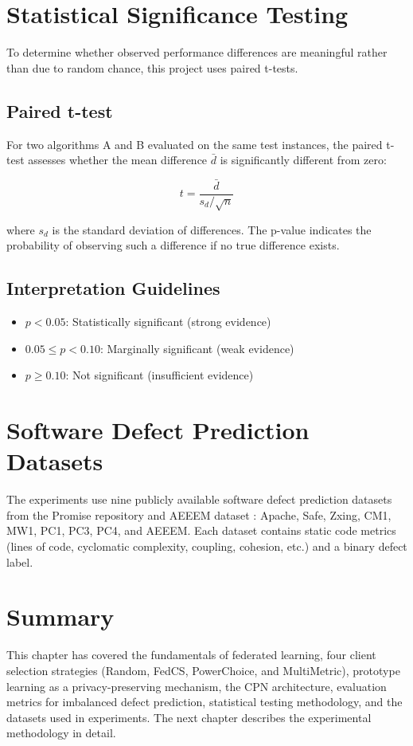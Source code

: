 \section{Statistical Significance Testing}

To determine whether observed performance differences are meaningful rather than due to random chance, this project uses paired t-tests.

\subsection{Paired t-test}

For two algorithms A and B evaluated on the same test instances, the paired t-test assesses whether the mean difference \(\bar{d}\) is significantly different from zero:

\[
t = \frac{\bar{d}}{s_d / \sqrt{n}}
\]

where \(s_d\) is the standard deviation of differences. The p-value indicates the probability of observing such a difference if no true difference exists.

\subsection{Interpretation Guidelines}

\begin{itemize}
    \item \(p < 0.05\): Statistically significant (strong evidence)
    \item \(0.05 \le p < 0.10\): Marginally significant (weak evidence)
    \item \(p \ge 0.10\): Not significant (insufficient evidence)
\end{itemize}

\section{Software Defect Prediction Datasets}

The experiments use nine publicly available software defect prediction datasets from the Promise repository \citep{menzies2007promise} and AEEEM dataset \citep{d2010empirical}: Apache, Safe, Zxing, CM1, MW1, PC1, PC3, PC4, and AEEEM. Each dataset contains static code metrics (lines of code, cyclomatic complexity, coupling, cohesion, etc.) and a binary defect label.

\section{Summary}

This chapter has covered the fundamentals of federated learning, four client selection strategies (Random, FedCS, PowerChoice, and MultiMetric), prototype learning as a privacy-preserving mechanism, the CPN architecture, evaluation metrics for imbalanced defect prediction, statistical testing methodology, and the datasets used in experiments. The next chapter describes the experimental methodology in detail.